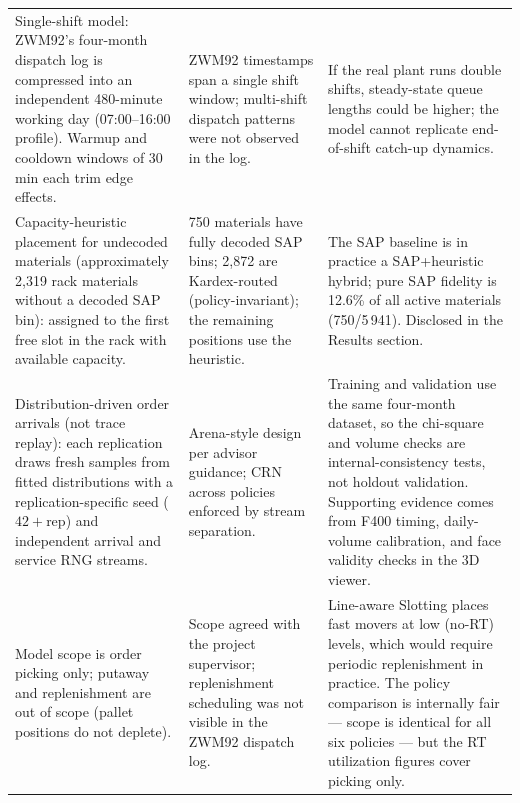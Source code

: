 \begin{table}[htbp]
\begin{tabular}{p{4.8cm} p{4.8cm} p{4.8cm}}
    Single-shift model: ZWM92's four-month dispatch log is compressed
    into an independent 480-minute working day (07:00--16:00 profile).
    Warmup and cooldown windows of 30 min each trim edge effects.
    &
    ZWM92 timestamps span a single shift window; multi-shift dispatch
    patterns were not observed in the log.
    &
    If the real plant runs double shifts, steady-state queue lengths
    could be higher; the model cannot replicate end-of-shift catch-up
    dynamics. \\[4pt]

    Capacity-heuristic placement for undecoded materials (approximately
    2,319 rack materials without a decoded SAP bin): assigned to the
    first free slot in the rack with available capacity.
    &
    750 materials have fully decoded SAP bins; 2,872 are Kardex-routed
    (policy-invariant); the remaining positions use the heuristic.
    &
    The SAP baseline is in practice a SAP+heuristic hybrid; pure SAP
    fidelity is 12.6\% of all active materials (750/5\,941).  Disclosed in the Results
    section. \\[4pt]

    Distribution-driven order arrivals (not trace replay): each
    replication draws fresh samples from fitted distributions with a
    replication-specific seed ($42 + \text{rep}$) and independent
    arrival and service RNG streams.
    &
    Arena-style design per advisor guidance; CRN across policies
    enforced by stream separation.
    &
    Training and validation use the same four-month dataset, so
    the chi-square and volume checks are internal-consistency tests,
    not holdout validation.  Supporting evidence comes from F400 timing,
    daily-volume calibration, and face validity checks in the 3D viewer. \\[4pt]

    Model scope is order picking only; putaway and replenishment are
    out of scope (pallet positions do not deplete).
    &
    Scope agreed with the project supervisor; replenishment scheduling
    was not visible in the ZWM92 dispatch log.
    &
    Line-aware Slotting places fast movers at low (no-RT) levels, which
    would require periodic replenishment in practice.  The policy
    comparison is internally fair --- scope is identical for all six
    policies --- but the RT utilization figures cover picking only. \\
    \bottomrule
  \end{tabular}
\end{table}

